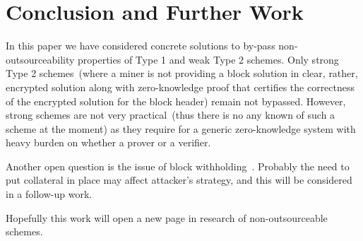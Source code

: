 \documentclass[11pt]{article}
\begin{document}
\section{Conclusion and Further Work}

In this paper we have considered concrete solutions to by-pass non-outsourceability properties of Type 1 and weak Type 2
schemes. Only strong Type 2 schemes~(where a miner is not providing a block solution in clear, rather, encrypted solution
along with zero-knowledge proof that certifies the correctness of the encrypted solution for the block header) remain
not bypassed. However, strong schemes are not very practical~(thus there is no any known of such a scheme at the
moment) as they require for a generic zero-knowledge system with heavy burden on whether a prover or a verifier.

Another open question is the issue of block withholding~\cite{courtois2014subversive}. Probably the need to put
collateral in place may affect attacker's strategy, and this will be considered in a follow-up work.

Hopefully this work will open a new page in research of non-outsourceable schemes.



\appendix
\end{document}

